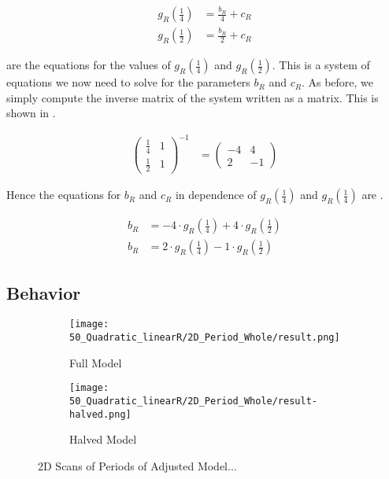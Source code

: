 \begin{subequations}
	\begin{align}
		g_R\left(\frac{1}{4}\right) & = \frac{b_R}{4} + c_R \label{equ:setup.quad.hybrid.A} \\
		g_R\left(\frac{1}{2}\right) & = \frac{b_R}{2} + c_R \label{equ:setup.quad.hybrid.B}
	\end{align}
\end{subequations}

 are the equations for the values of $g_R\left(\frac{1}{4}\right)$ and $g_R\left(\frac{1}{2}\right)$.
This is a system of equations we now need to solve for the parameters $b_R$ and $c_R$.
As before, we simply compute the inverse matrix of the system written as a matrix.
This is shown in .

\begin{align}
	\begin{pmatrix}
		\frac{1}{4} & 1 \\
		\frac{1}{2} & 1
	\end{pmatrix}^{-1} & =
	\begin{pmatrix}
		-4 & 4  \\
		2  & -1
	\end{pmatrix}
	\label{equ:setup.quad.hybrid.matrix}
\end{align}

Hence the equations for $b_R$ and $c_R$ in dependence of $g_R\left(\frac{1}{4}\right)$ and $g_R\left(\frac{1}{4}\right)$ are .

\begin{align}
	b_R & = -4 \cdot g_R\left(\frac{1}{4}\right) + 4 \cdot g_R\left(\frac{1}{2}\right) \label{equ:setup.quad.hybrid.bR} \\
	b_R & = 2 \cdot g_R\left(\frac{1}{4}\right) - 1 \cdot g_R\left(\frac{1}{2}\right) \label{equ:setup.quad.hybrid.cR}
\end{align}

\subsection{Behavior}


\begin{figure}
	\centering
	\begin{subfigure}{0.4\textwidth}
		\centering
		\texttt{[image: 50\_Quadratic\_linearR/2D\_Period\_Whole/result.png]}
		\caption{Full Model}
		\label{fig:quadratic.full.fit.lin.period.full}
	\end{subfigure}
	\begin{subfigure}{0.4\textwidth}
		\centering
		\texttt{[image: 50\_Quadratic\_linearR/2D\_Period\_Whole/result-halved.png]}
		\caption{Halved Model}
		\label{fig:quadratic.full.fit.lin.period.halved}
	\end{subfigure}
	\caption{2D Scans of Periods of Adjusted Model...}
\end{figure}

